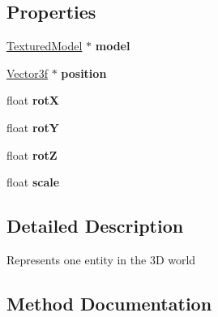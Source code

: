 \subsection*{Properties}
\begin{DoxyCompactItemize}
\item 
\hyperlink{interface_textured_model}{Textured\+Model} $\ast$ {\bfseries model}\hypertarget{interface_entity_a02801075948569b0e2b52bed0e0f7c4c}{}\label{interface_entity_a02801075948569b0e2b52bed0e0f7c4c}

\item 
\hyperlink{interface_vector3f}{Vector3f} $\ast$ {\bfseries position}\hypertarget{interface_entity_a5b46de87209b8b087852e4cd92e4218c}{}\label{interface_entity_a5b46de87209b8b087852e4cd92e4218c}

\item 
float {\bfseries rotX}\hypertarget{interface_entity_a872123c5ed32f888d9d34114fcded890}{}\label{interface_entity_a872123c5ed32f888d9d34114fcded890}

\item 
float {\bfseries rotY}\hypertarget{interface_entity_ab786b45308be8e93648e092703910909}{}\label{interface_entity_ab786b45308be8e93648e092703910909}

\item 
float {\bfseries rotZ}\hypertarget{interface_entity_aea2a72cc52774873d440d6098b4adfe7}{}\label{interface_entity_aea2a72cc52774873d440d6098b4adfe7}

\item 
float {\bfseries scale}\hypertarget{interface_entity_a8c1b0331fdaca5874c15e10de1ed3531}{}\label{interface_entity_a8c1b0331fdaca5874c15e10de1ed3531}

\end{DoxyCompactItemize}


\subsection{Detailed Description}
Represents one entity in the 3D world 

\subsection{Method Documentation}
